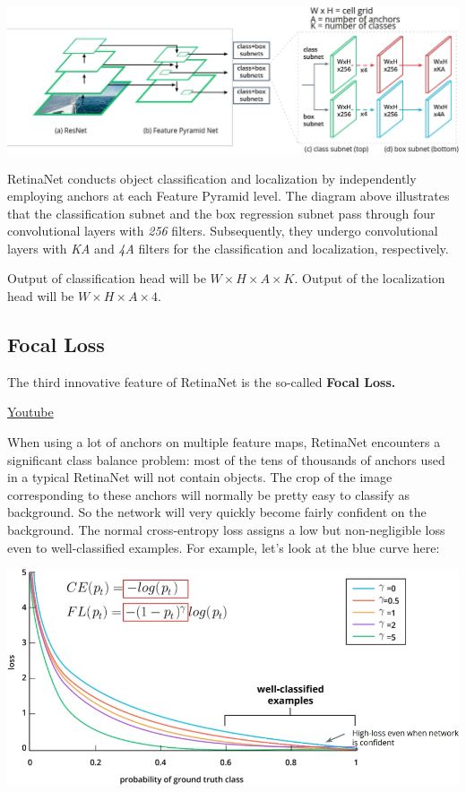 \includegraphics[width=1\linewidth]{img//cnn//depth/retinanet.jpeg}

RetinaNet conducts object classification and localization by independently employing anchors at each Feature Pyramid level. The diagram above illustrates that the classification subnet and the box regression subnet pass through four convolutional layers with \textit{256} filters. Subsequently, they undergo convolutional layers with \textit{KA} and \textit{4A} filters for the classification and localization, respectively. \newline

Output of classification head will be \(W \times H \times A \times K\). Output of the localization head will be \(W \times H \times A \times 4\).

\subsection{Focal Loss}

The third innovative feature of RetinaNet is the so-called \textbf{Focal Loss.} \newline

\href{https://www.youtube.com/watch?v=NDgix_YVm2A&ab_channel=Udacity}{Youtube} \newline

When using a lot of anchors on multiple feature maps, RetinaNet encounters a significant class balance problem: most of the tens of thousands of anchors used in a typical RetinaNet will not contain objects. The crop of the image corresponding to these anchors will normally be pretty easy to classify as background. So the network will very quickly become fairly confident on the background. The normal cross-entropy loss assigns a low but non-negligible loss even to well-classified examples. For example, let's look at the blue curve here:

\includegraphics[width=0.75\linewidth]{img//cnn//depth/focal-loss.jpeg}

